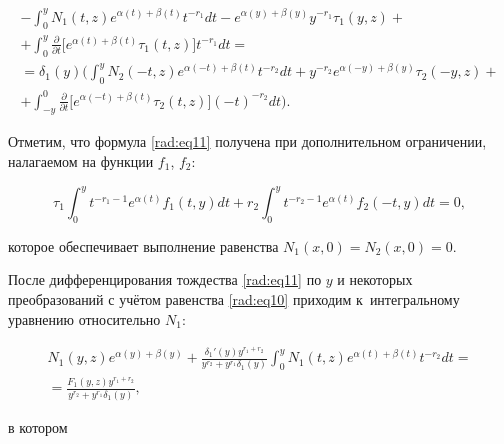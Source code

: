 \begin{multline}

-  \int _0^y N_1(t,z) e^{\alpha(t)+\beta(t)} t^{-r_1} dt - e^{\alpha(y)+\beta(y)}y^{-r_1}\tau_1(y,z)+

\\

+  \int _0^y \frac{\partial}{\partial t} \bigl[e^{\alpha(t)+\beta(t)} \tau_1(t,z)\bigr] t^{-r_1} dt = \\

= \delta_1(y) \biggl( \int _0^y N_2(-t,z)  e^{\alpha(-t)+\beta(t)} t^{-r_2} dt + y^{-r_2} e^{\alpha(-y)+\beta(y)} \tau_2(-y,z) + \\

\label{rad:eq11}

+ \int _{-y}^0 \frac{\partial}{\partial t} \bigl[e^{\alpha(-t)+\beta(t)} \tau_2(t,z)\bigr] (-t)^{-r_2} dt\biggr).

\end{multline}



Отметим, что формула \eqref{rad:eq11} получена при дополнительном ограничении, налагаемом на функции $f_1$, $f_2$:

\begin{equation}

\label{rad:eq12}

\tau_1  \int _0^y t^{-r_1-1} e^{\alpha(t)} f_1(t,y) dt + r_2 \int _0^y t^{-r_2-1} e^{\alpha(t)} f_2(-t,y) dt = 0,

\end{equation}

которое  обеспечивает выполнение равенства $N_1(x, 0) ={N_2(x, 0)=0}$.



После дифференцирования тождества \eqref{rad:eq11} по $y$ и некоторых преобразований с учётом равенства \eqref{rad:eq10} приходим к~интегральному уравнению относительно $N_1$:

\begin{multline}

N_1(y,z) e^{\alpha(y)+\beta(y)}  + \frac{\delta_1'(y) y^{r_1+r_2}}{y^{r_2}+y^{r_1}\delta_1(y)}  \int _0^y N_1(t,z) e^{\alpha(t)+\beta(t)} t^{-r_2} dt = \\

\label{rad:eq13}

= \frac{F_1(y,z) y^{r_1+r_2}}{y^{r_2}+y^{r_1}\delta_1(y)},

\end{multline}

в котором

